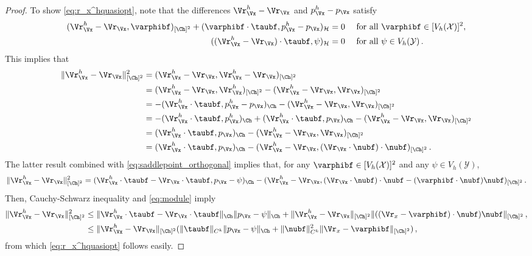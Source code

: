 \documentclass{siamart1116}
\numberwithin{theorem}{section}
\begin{document}
\begin{proof}
To show \eqref{eq:r_x^hquasiopt}, note that
the differences $\Vr_\Vx^h-\Vr_\Vx$ and  $p_\Vx^h-p_\Vx$ satisfy
\begin{subequations}
	\label{eq:saddlepoint_orthogonal}
	\begin{align}
	(\Vr_\Vx^h-\Vr_\Vx,\varphibf)_{[\Ch]^2}  +(\varphibf \cdot \taubf, p_\Vx^h - p_\Vx )_{\mathcal  H}
	&= 0&& \text{ for all } \varphibf \in[V_h(\mathcal X)]^2,\label{eq:1RKHSh22}\\
	\;((\Vr_\Vx^h-\Vr_\Vx)\cdot \taubf, \psi)_{\mathcal H}
	& =0 &&\text{ for all } \psi \in V_h(\mathcal Y) \label{eq:2RKHSh22}\,.
	\end{align}
\end{subequations}
This implies that
\begin{align}
\nonumber
\|\Vr_\Vx^h - \Vr_\Vx\|_{[\Ch]^2}^2 
&= (\Vr_\Vx^h-\Vr_\Vx,\Vr_\Vx^h-\Vr_\Vx)_{[\Ch]^2}\\
\nonumber
&= (\Vr_\Vx^h-\Vr_\Vx,\Vr_\Vx^h)_{[\Ch]^2} - (\Vr_\Vx^h-\Vr_\Vx,\Vr_\Vx)_{[\Ch]^2}\\
\nonumber
&= -(\Vr_\Vx^h\cdot\taubf,p_\Vx^h - p_\Vx )_{\Ch} - (\Vr_\Vx^h-\Vr_\Vx,\Vr_\Vx)_{[\Ch]^2}\\
\nonumber
&= -(\Vr_\Vx^h\cdot\taubf,p_\Vx^h )_{\Ch} + (\Vr_\Vx^h\cdot\taubf,p_\Vx )_{\Ch}
- (\Vr_\Vx^h-\Vr_\Vx,\Vr_\Vx)_{[\Ch]^2}\\
\nonumber
&= (\Vr_\Vx^h\cdot\taubf,p_\Vx )_{\Ch} - (\Vr_\Vx^h-\Vr_\Vx,\Vr_\Vx)_{[\Ch]^2}\\
\nonumber
&= (\Vr_\Vx^h\cdot\taubf,p_\Vx )_{\Ch} - (\Vr_\Vx^h-\Vr_\Vx,(\Vr_\Vx\cdot\nubf)\cdot\nubf)_{[\Ch]^2}\,.
\end{align}
The latter result combined with \cref{eq:saddlepoint_orthogonal} implies that,
for any $\varphibf \in [V_h(\mathcal X)]^2$ and any $\psi \in V_h(\mathcal Y)$,
\begin{equation}
\|\Vr_\Vx^h - \Vr_\Vx\|_{[\Ch]^2}^2 
= (\Vr_\Vx^h\cdot\taubf-\Vr_\Vx\cdot\taubf,p_\Vx -  \psi)_{\Ch} 
- (\Vr_\Vx^h-\Vr_\Vx,(\Vr_\Vx\cdot\nubf)\cdot\nubf-(\varphibf\cdot\nubf)\nubf)_{[\Ch]^2}\,.
\end{equation}
Then, Cauchy-Schwarz inequality and \cref{eq:module} imply
\begin{align}
\nonumber
\|\Vr_\Vx^h - \Vr_\Vx\|_{[\Ch]^2}^2
&\le \|\Vr_\Vx^h\cdot\taubf-\Vr_\Vx\cdot\taubf\|_{\Ch}\|p_\Vx -  \psi\|_{\Ch}
+ \|\Vr_\Vx^h-\Vr_\Vx\|_{[\Ch]^2} \|((\Vr_x-\varphibf)\cdot \nubf)\nubf\|_{[\Ch]^2}\,,\\
\label{eq:rx-rxhineq}
&\le \|\Vr_\Vx^h-\Vr_\Vx\|_{[\Ch]^2}
( \Vert \taubf\Vert_{C^k} \|p_\Vx -  \psi\|_{\Ch}
+\Vert \nubf\Vert_{C^k}^2\|\Vr_x-\varphibf\|_{[\Ch]^2})\,,
\end{align}
from which \eqref{eq:r_x^hquasiopt} follows easily.


\end{proof}
\end{document}
